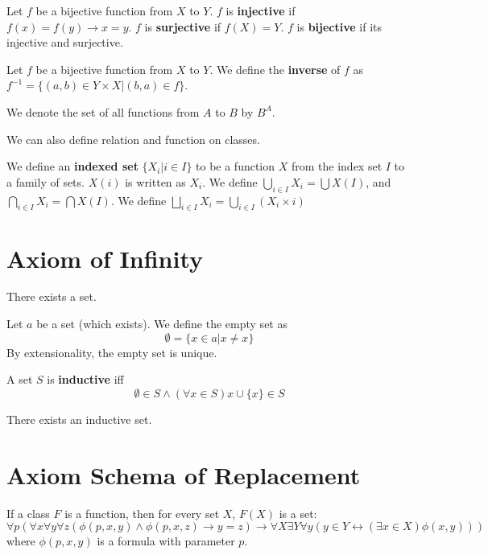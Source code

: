 \documentclass[12pt]{book}
\begin{document}
\begin{definition}
	Let $f$ be a bijective function from $X$ to $Y$. $f$ is {\bf injective} if $f(x)=f(y)\rightarrow x=y$. $f$ is {\bf surjective} if $f(X)=Y$. $f$ is {\bf bijective} if its injective and surjective.
\end{definition}
	
\begin{definition}
	Let $f$ be a bijective function from $X$ to $Y$. We define the {\bf inverse} of $f$ as $f^{-1}=\{(a,b)\in Y\times X|(b,a)\in f\}$.
\end{definition}

\begin{definition}
	We denote the set of all functions from $A$ to $B$ by $B^A$.
\end{definition}

We can also define relation and function on classes.

\begin{definition}
	We define an {\bf indexed set} $\{X_i|i\in I\}$ to be a function $X$ from the index set $I$ to a family of sets. $X(i)$ is written as $X_i$. We define $\bigcup_{i\in I}X_i=\bigcup X(I)$, and $\bigcap_{i\in I}X_i=\bigcap X(I)$. We define $\bigsqcup_{i\in I}X_i=\bigcup_{i\in I}(X_i\times i)$
\end{definition}

\section{Axiom of Infinity}
\begin{axiom}
	There exists a set.
\end{axiom}
\begin{definition}
	Let $a$ be a set (which exists). We define the empty set as
	\begin{equation}
		\emptyset=\{x\in a|x\neq x\}
	\end{equation}
	By extensionality, the empty set is unique.
\end{definition}
\begin{definition}
	A set $S$ is {\bf inductive} iff
	\begin{equation}
		\emptyset\in S\wedge(\forall x\in S)x\cup\{x\}\in S
	\end{equation}
\end{definition}
\begin{axiom}
	There exists an inductive set.
\end{axiom}
\section{Axiom Schema of Replacement}
\begin{axiom}
	If a class $F$ is a function, then for every set $X$, $F(X)$ is a set:
	\begin{equation}
		\forall p(\forall x\forall y \forall z(\phi(p,x,y)\wedge\phi(p,x,z)\rightarrow y=z)\rightarrow\forall X\exists Y\forall y(y\in Y\leftrightarrow (\exists x\in X)\phi(x,y)))
	\end{equation}
	where $\phi(p,x,y)$ is a formula with parameter $p$.
\end{axiom}
\end{document}
